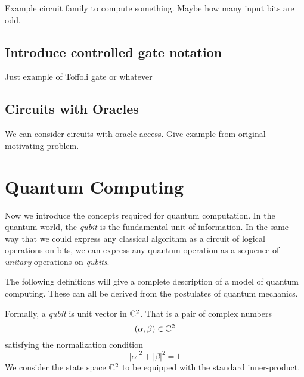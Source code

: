         \begin{example}
            Example circuit family to compute something. Maybe how many input bits are odd.  \begin{figure}[h]
                \centering
                    \placeholderfig
                \caption{}
            \end{figure}

        \end{example}
        
        \subsection{Introduce controlled gate notation}
        
        Just example of Toffoli gate or whatever

        \subsection{Circuits with Oracles}

        We can consider circuits with oracle access.  Give example from original motivating problem.



\section{Quantum Computing}
        Now we introduce the concepts required for quantum computation. In the quantum world, the \emph{qubit} is 
        the fundamental unit of information. In the same way that we could express any classical algorithm as a 
        circuit of logical operations on bits, we can express any quantum operation as a sequence of \emph{unitary} 
        operations on \emph{qubits}.
        
        The following definitions will give a complete description of a model of quantum computing. These can all 
        be derived from the postulates of quantum mechanics.

        \begin{definition}
            Formally, a \emph{qubit} is unit vector in $\mathbb{C}^2$. That is a pair of complex numbers
            \[
                (\alpha, \beta) \in \mathbb{C}^2
            \]
            satisfying the normalization condition %
            \[
                |\alpha|^2 + |\beta|^2 = 1
            \]
            We consider the state space $\mathbb{C}^2$ to be equipped with the standard inner-product.
        \end{definition}
        
